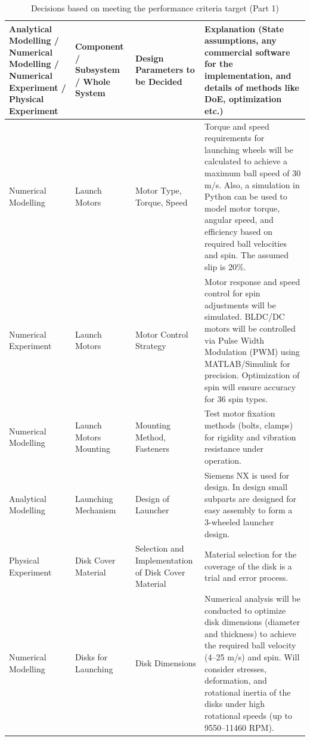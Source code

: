 \documentclass[12pt]{report}
\renewcommand{\arraystretch}{1.2} %
\begin{document}
\begin{table}[H]
\centering
\caption{Decisions based on meeting the performance criteria target (Part 1)}
\scriptsize %
\renewcommand{\arraystretch}{1.5}
\setlength{\tabcolsep}{4pt}
\begin{tabular}{|>{\raggedright\arraybackslash}p{3cm}|>{\raggedright\arraybackslash}p{3cm}|>{\raggedright\arraybackslash}p{3cm}|>{\raggedright\arraybackslash}p{6cm}|}
\hline
\textbf{Analytical Modelling / Numerical Modelling / Numerical Experiment / Physical Experiment} & \textbf{Component / Subsystem / Whole System} & \textbf{Design Parameters to be Decided} & \textbf{Explanation (State assumptions, any commercial software for the implementation, and details of methods like DoE, optimization etc.)} \\ \hline
Numerical Modelling & Launch Motors & Motor Type, Torque, Speed & Torque and speed requirements for launching wheels will be calculated to achieve a maximum ball speed of 30 m/s. Also, a simulation in Python can be used to model motor torque, angular speed, and efficiency based on required ball velocities and spin. The assumed slip is 20\%. \\ \hline
Numerical Experiment & Launch Motors & Motor Control Strategy & Motor response and speed control for spin adjustments will be simulated. BLDC/DC motors will be controlled via Pulse Width Modulation (PWM) using MATLAB/Simulink for precision. Optimization of spin will ensure accuracy for 36 spin types. \\ \hline
Numerical Modelling & Launch Motors Mounting & Mounting Method, Fasteners & Test motor fixation methods (bolts, clamps) for rigidity and vibration resistance under operation. \\ \hline
Analytical Modelling & Launching Mechanism & Design of Launcher & Siemens NX is used for design. In design small subparts are designed for easy assembly to form a 3-wheeled launcher design. \\ \hline
Physical Experiment & Disk Cover Material & Selection and Implementation of Disk Cover Material & Material selection for the coverage of the disk is a trial and error process. \\ \hline
Numerical Modelling & Disks for Launching & Disk Dimensions & Numerical analysis will be conducted to optimize disk dimensions (diameter and thickness) to achieve the required ball velocity (4--25 m/s) and spin. Will consider stresses, deformation, and rotational inertia of the disks under high rotational speeds (up to 9550--11460 RPM). \\ \hline
\end{tabular}
\label{tab:performance_criteria}
\end{table}
\end{document}

